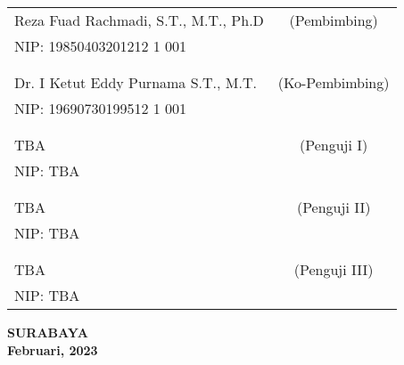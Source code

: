     \noindent
    \begin{tabularx}{\textwidth}{X c}
      Reza Fuad Rachmadi, S.T., M.T., Ph.D          & (Pembimbing) \\
      NIP: 19850403201212 1 001      & \\
      &  \\
      &  \\
      Dr. I Ketut Eddy Purnama S.T., M.T.    & (Ko-Pembimbing) \\
      NIP: 19690730199512 1 001        & \\
      &  \\
      &  \\
      TBA  & (Penguji I) \\
      NIP: TBA        & \\
      &  \\
      &  \\
      TBA  & (Penguji II) \\
      NIP: TBA        & \\
      &  \\
      &  \\
      TBA             & (Penguji III) \\
      NIP: TBA        & \\
    \end{tabularx}
  \endgroup

  \vspace{8ex}

  \begin{center}
    \textbf{SURABAYA} \\
    \textbf{Februari, 2023}
  \end{center}
\endgroup
